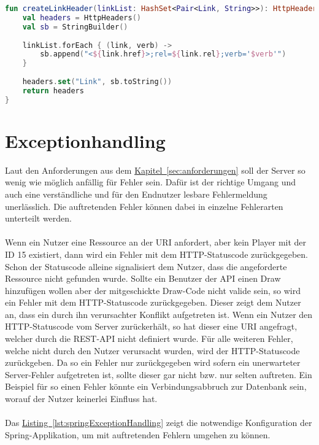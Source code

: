 \begin{lstlisting}[style=lstStyleFramed, language=Kotlin, caption={Implementierung: \enquote{Links zu String} Parse-Funktion}, label=lst:createLinkHeader, float]
fun createLinkHeader(linkList: HashSet<Pair<Link, String>>): HttpHeaders {
	val headers = HttpHeaders()
	val sb = StringBuilder()
	
	linkList.forEach { (link, verb) ->
		sb.append("<${link.href}>;rel=${link.rel};verb='$verb'")
	}
	
	headers.set("Link", sb.toString())
	return headers
}
\end{lstlisting}

\section{Exceptionhandling}
Laut den Anforderungen aus dem \hyperref[sec:anforderungen]{Kapitel~\ref{sec:anforderungen}} soll der Server so wenig wie möglich anfällig für Fehler sein. Dafür ist der richtige Umgang und auch eine verständliche und für den Endnutzer lesbare Fehlermeldung unerlässlich. Die auftretenden Fehler können dabei in einzelne Fehlerarten unterteilt werden.\\
\\
Wenn ein Nutzer eine Ressource an der \gls{URI}  anfordert, aber kein Player mit der ID 15 existiert, dann wird ein Fehler mit dem \gls{HTTP}-Statuscode  zurückgegeben. Schon der Statuscode alleine signalisiert dem Nutzer, dass die angeforderte Ressource nicht gefunden wurde. Sollte ein Benutzer der \gls{API} einen Draw hinzufügen wollen aber der mitgeschickte Draw-Code nicht valide sein, so wird ein Fehler mit dem \gls{HTTP}-Statuscode  zurückgegeben. Dieser zeigt dem Nutzer an, dass ein durch ihn verursachter Konflikt aufgetreten ist. Wenn ein Nutzer den \gls{HTTP}-Statuscode  vom Server zurückerhält, so hat dieser eine \gls{URI} angefragt, welcher durch die \gls{REST}-\gls{API} nicht definiert wurde. Für alle weiteren Fehler, welche nicht durch den Nutzer verursacht wurden, wird der \gls{HTTP}-Statuscode  zurückgeben. Da so ein Fehler nur zurückgegeben wird sofern ein unerwarteter Server-Fehler aufgetreten ist, sollte dieser gar nicht bzw. nur selten auftreten. Ein Beispiel für so einen Fehler könnte ein Verbindungsabbruch zur Datenbank sein, worauf der Nutzer keinerlei Einfluss hat.\\
\\
Das \hyperref[lst:springExceptionHandling]{Listing~\ref{lst:springExceptionHandling}} zeigt die notwendige Konfiguration der Spring-Applikation, um mit auftretenden Fehlern umgehen zu können.\\
